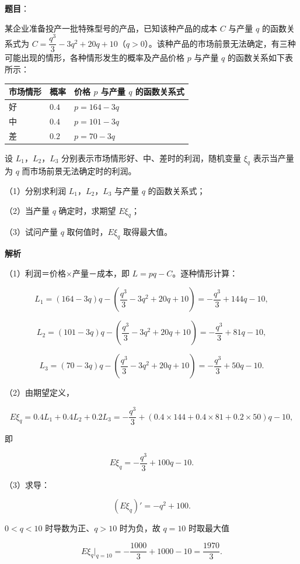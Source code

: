 \begin{answer}

\textbf{题目}：

某企业准备投产一批特殊型号的产品，已知该种产品的成本 $C$ 与产量 $q$ 的函数关系式为 $C=\dfrac{q^3}{3}-3q^2+20q+10$（$q>0$）。该种产品的市场前景无法确定，有三种可能出现的情形，各种情形发生的概率及产品价格 $p$ 与产量 $q$ 的函数关系如下表所示：

\begin{center}
\begin{tabular}{lll}
\toprule
市场情形 & 概率 & 价格 $p$ 与产量 $q$ 的函数关系式 \\
\midrule
好 & $0.4$ & $p=164-3q$ \\
中 & $0.4$ & $p=101-3q$ \\
差 & $0.2$ & $p=70-3q$ \\
\bottomrule
\end{tabular}
\end{center}

设 $L_1$，$L_2$，$L_3$ 分别表示市场情形好、中、差时的利润，随机变量 $\xi_q$ 表示当产量为 $q$ 而市场前景无法确定时的利润。

（1）分别求利润 $L_1$，$L_2$，$L_3$ 与产量 $q$ 的函数关系式；

（2）当产量 $q$ 确定时，求期望 $E\xi_q$；

（3）试问产量 $q$ 取何值时，$E\xi_q$ 取得最大值。

\textbf{解析}

（1）利润＝价格×产量－成本，即 $L=pq-C$。逐种情形计算：

\nopagebreak[4]
\[L_1=(164-3q)q-\left(\frac{q^3}3-3q^2+20q+10\right)=-\frac{q^3}3+144q-10,\]

\nopagebreak[4]
\[L_2=(101-3q)q-\left(\frac{q^3}3-3q^2+20q+10\right)=-\frac{q^3}3+81q-10,\]

\nopagebreak[4]
\[L_3=(70-3q)q-\left(\frac{q^3}3-3q^2+20q+10\right)=-\frac{q^3}3+50q-10.\]

（2）由期望定义，

\nopagebreak[4]
\[E\xi_q=0.4L_1+0.4L_2+0.2L_3=-\frac{q^3}3+(0.4\times144+0.4\times81+0.2\times50)q-10,\]

即

\nopagebreak[4]
\[E\xi_q=-\frac{q^3}3+100q-10.\]

（3）求导：

\nopagebreak[4]
\[\left(E\xi_q\right)'=-q^2+100.\]

$0<q<10$ 时导数为正、$q>10$ 时为负，故 $q=10$ 时取最大值

\nopagebreak[4]
\[E\xi_q\Big|_{q=10}=-\frac{1000}3+1000-10=\frac{1970}3.\]


\end{answer}
